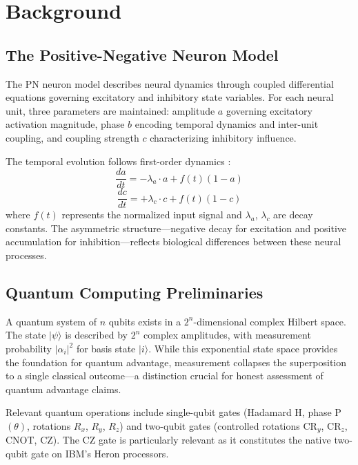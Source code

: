 \documentclass[pdflatex,sn-mathphys-num]{sn-jnl}
\begin{document}
\section{Background}
\label{sec:background}

\subsection{The Positive-Negative Neuron Model}
\label{sec:pn-model}

The PN neuron model describes neural dynamics through coupled differential equations governing excitatory and inhibitory state variables. For each neural unit, three parameters are maintained: amplitude $a$ governing excitatory activation magnitude, phase $b$ encoding temporal dynamics and inter-unit coupling, and coupling strength $c$ characterizing inhibitory influence.

The temporal evolution follows first-order dynamics \cite{gupta2003}:
\begin{equation}
\frac{da}{dt} = -\lambda_a \cdot a + f(t)(1 - a)
\end{equation}
\begin{equation}
\frac{dc}{dt} = +\lambda_c \cdot c + f(t)(1 - c)
\end{equation}
where $f(t)$ represents the normalized input signal and $\lambda_a$, $\lambda_c$ are decay constants. The asymmetric structure---negative decay for excitation and positive accumulation for inhibition---reflects biological differences between these neural processes.

\subsection{Quantum Computing Preliminaries}
\label{sec:quantum-prelim}

A quantum system of $n$ qubits exists in a $2^n$-dimensional complex Hilbert space. The state $|\psi\rangle$ is described by $2^n$ complex amplitudes, with measurement probability $|\alpha_i|^2$ for basis state $|i\rangle$. While this exponential state space provides the foundation for quantum advantage, measurement collapses the superposition to a single classical outcome---a distinction crucial for honest assessment of quantum advantage claims.

Relevant quantum operations include single-qubit gates (Hadamard H, phase P$(\theta)$, rotations $R_x$, $R_y$, $R_z$) and two-qubit gates (controlled rotations CR$_y$, CR$_z$, CNOT, CZ). The CZ gate is particularly relevant as it constitutes the native two-qubit gate on IBM's Heron processors.
\end{document}
